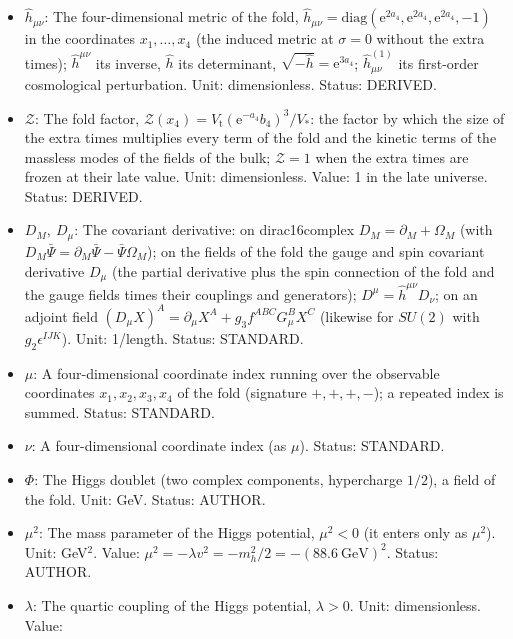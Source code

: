 \documentclass[
  10pt,
]{article}
\providecommand{\tightlist}{%
  \setlength{\itemsep}{0pt}\setlength{\parskip}{0pt}}
\begin{document}
\begin{itemize}
\tightlist
\item
  \(\hat h_{\mu\nu}\): The four-dimensional metric of the fold,
  \(\hat h_{\mu\nu} = \mathrm{diag}(\mathrm{e}^{2a_4}, \mathrm{e}^{2a_4}, \mathrm{e}^{2a_4}, -1)\)
  in the coordinates \(x_1, \dots, x_4\) (the induced metric at
  \(\sigma = 0\) without the extra times); \(\hat h^{\mu\nu}\) its
  inverse, \(\hat h\) its determinant,
  \(\sqrt{-\hat h} = \mathrm{e}^{3a_4}\); \(\hat h^{(1)}_{\mu\nu}\) its
  first-order cosmological perturbation. Unit: dimensionless. Status:
  DERIVED.
\item
  \(\mathcal{Z}\): The fold factor,
  \(\mathcal{Z}(x_4) = V_{\mathrm{t}}(\mathrm{e}^{-a_4}b_4)^3/V_*\): the
  factor by which the size of the extra times multiplies every term of
  the fold and the kinetic terms of the massless modes of the fields of
  the bulk; \(\mathcal{Z} = 1\) when the extra times are frozen at their
  late value. Unit: dimensionless. Value: 1 in the late universe.
  Status: DERIVED.
\item
  \(D_M,\ D_\mu\): The covariant derivative: on dirac16complex
  \(D_M = \partial_M + \Omega_M\) (with
  \(D_M\bar\Psi = \partial_M\bar\Psi - \bar\Psi\Omega_M\)); on the
  fields of the fold the gauge and spin covariant derivative \(D_\mu\)
  (the partial derivative plus the spin connection of the fold and the
  gauge fields times their couplings and generators);
  \(D^\mu = \hat h^{\mu\nu}D_\nu\); on an adjoint field
  \((D_\mu X)^A = \partial_\mu X^A + g_3f^{ABC}G^B_\mu X^C\) (likewise
  for \(SU(2)\) with \(g_2\epsilon^{IJK}\)). Unit: 1/length. Status:
  STANDARD.
\item
  \(\mu\): A four-dimensional coordinate index running over the
  observable coordinates \(x_1, x_2, x_3, x_4\) of the fold (signature
  \(+,+,+,-\)); a repeated index is summed. Status: STANDARD.
\item
  \(\nu\): A four-dimensional coordinate index (as \(\mu\)). Status:
  STANDARD.
\item
  \(\Phi\): The Higgs doublet (two complex components, hypercharge
  \(1/2\)), a field of the fold. Unit: GeV. Status: AUTHOR.
\item
  \(\mu^2\): The mass parameter of the Higgs potential, \(\mu^2 < 0\)
  (it enters only as \(\mu^2\)). Unit: GeV\(^2\). Value:
  \(\mu^2 = -\lambda v^2 = -m_h^2/2 = -(88.6\ \mathrm{GeV})^2\). Status:
  AUTHOR.
\item
  \(\lambda\): The quartic coupling of the Higgs potential,
  \(\lambda > 0\). Unit: dimensionless. Value:

\end{itemize}
\end{document}
